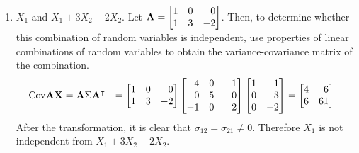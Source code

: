 \begin{enumerate}
	\item $X_1$ and $X_1 + 3X_2 -2X_2$. Let $\mf{A} = \m{1 & 0 & 0 \\ 1 & 3 & -2}$. Then, to determine whether this combination of random variables is independent, use properties of linear combinations of random variables to obtain the variance-covariance matrix of the combination.
		\begin{align*}
			\Cov{\mf{A} \mf{X}} &= \mf{A} \Sigma \mf{A}^{\T}
			&= \m{1 & 0 & 0 \\ 1 & 3 & -2} \m{4 & 0 & -1 \\ 0 & 5 & 0 \\ -1 & 0 & 2} \m{1 & 1 \\ 0 & 3 \\ 0 & -2}
			&= \m{4 & 6 \\ 6 & 61}
		\end{align*}
		After the transformation, it is clear that $\sigma_{12} = \sigma_{21} \neq 0$. Therefore $X_1$ is not independent from $X_1 + 3X_2 -2X_2$.
\end{enumerate}

\newpage
